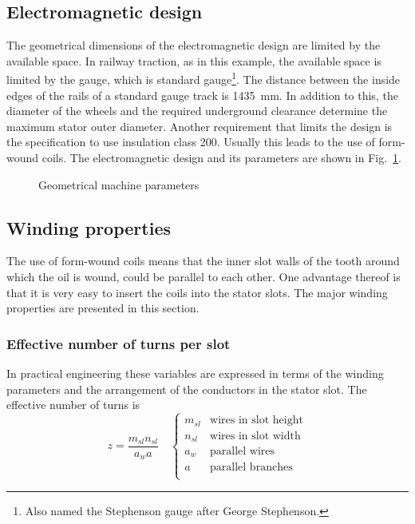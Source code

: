 \subsection{Electromagnetic design}
The geometrical dimensions of the electromagnetic design are limited by the available space. In railway traction, as in this example, the available space is limited by the gauge, which is standard gauge\footnote{Also named the Stephenson gauge after George Stephenson.}. The distance between the inside edges of the rails of a standard gauge track is \SI{1435}{mm}. In addition to this, the diameter of the wheels and the required  underground clearance determine the maximum stator outer diameter. Another requirement that limits the design is the specification to use insulation class \num{200}. Usually this leads to the use of form-wound coils. The electromagnetic design and its parameters are shown in Fig.~\ref{fig:FEA_design}.
\begin{figure}[htbp]
  \centering
    
  \caption{Geometrical machine parameters}
  \label{fig:FEA_design}
\end{figure}

\subsection{Winding properties}
The use of form-wound coils means that the inner slot walls of the tooth around which the oil is wound, could be parallel to each other. One advantage thereof is that it is very easy to insert the coils into the stator slots. The major winding properties are presented in this section. 

\subsubsection{Effective number of turns per slot}
In practical engineering these variables are expressed in terms of the winding parameters and the arrangement of the conductors in the stator slot. The effective number of turns is 
\begin{equation}
  \label{eqn:z}
  z = \frac{m_{sl}n_{sl}}{a_w a}
  \quad
  \begin{cases}
  m_{sl} & \mbox{wires in slot height} \\
  n_{sl} & \mbox{wires in slot width}  \\
  a_w    & \mbox{parallel wires} \\
  a      & \mbox{parallel branches} \\
  \end{cases}
\end{equation} 

